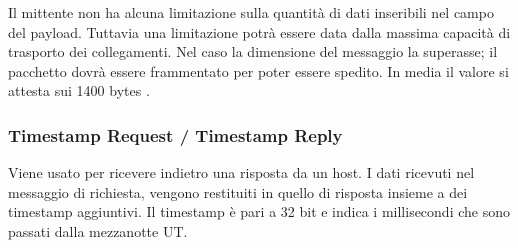 Il mittente non ha alcuna limitazione sulla quantità di dati inseribili  nel campo del payload. 
Tuttavia una limitazione potrà essere data dalla massima capacità di trasporto dei collegamenti. 
Nel caso la dimensione del messaggio la superasse; il pacchetto dovrà essere frammentato per poter essere spedito. 
In media il valore si attesta sui 1400 bytes \cite{max_MTU_capacity}.  

\subsubsection{Timestamp Request / Timestamp Reply} 
Viene usato per ricevere indietro una risposta da un host. 
I dati ricevuti nel messaggio di richiesta, vengono restituiti in quello di risposta insieme a dei timestamp aggiuntivi. 
Il timestamp è pari a 32 bit e indica i millisecondi che sono passati dalla mezzanotte UT.
\vspace{2ex} \newline
